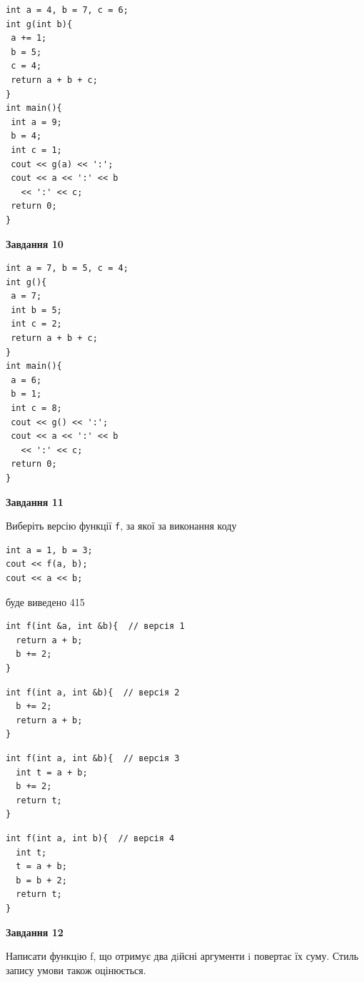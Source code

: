 \documentclass[12pt, ukrainian]{article}
\def\code#1{\Verb!#1!}
\begin{document}
{\begin {large}
\begin{minipage}[t]{7.0cm}
\begin{verbatim}
int a = 4, b = 7, c = 6;
int g(int b){
 a += 1;
 b = 5;
 c = 4;
 return a + b + c;
}
int main(){
 int a = 9;
 b = 4;
 int c = 1;
 cout << g(a) << ':';
 cout << a << ':' << b 
   << ':' << c;
 return 0;
}
\end{verbatim}



\begin{center}
\textbf{Завдання 10}
\end{center}
\vspace{-8mm}

\begin{verbatim}
int a = 7, b = 5, c = 4;
int g(){
 a = 7;
 int b = 5;
 int c = 2;
 return a + b + c;
}
int main(){
 a = 6;
 b = 1;
 int c = 8;
 cout << g() << ':';
 cout << a << ':' << b 
   << ':' << c;
 return 0;
}
\end{verbatim}

\end{minipage}
\vline \hspace{1mm}
\begin{minipage}[t]{11.0cm}

\begin{center}
\textbf{Завдання 11}
\end{center}
Виберіть версію функції \code{f}, за якої за виконання коду
\begin{verbatim}
int a = 1, b = 3;
cout << f(a, b);
cout << a << b;
\end{verbatim}

буде виведено 415

\begin{verbatim}
int f(int &a, int &b){  // версія 1
  return a + b;
  b += 2;
}
\end{verbatim}

\vspace{-8mm}\begin{verbatim}
int f(int a, int &b){  // версія 2
  b += 2;
  return a + b;
}
\end{verbatim}

\vspace{-8mm}\begin{verbatim}
int f(int a, int &b){  // версія 3
  int t = a + b;
  b += 2;
  return t;
}
\end{verbatim}

\vspace{-8mm}\begin{verbatim}
int f(int a, int b){  // версія 4
  int t;
  t = a + b;
  b = b + 2;
  return t;
}
\end{verbatim}



\begin{center}
\textbf{Завдання 12}
\end{center}

Написати функцiю f, що отримує два дiйсні аргументи i повертає їх суму. Стиль запису умови також оцінюється.\par

\end{minipage}

\end {large}}
\newpage
\end{document}
